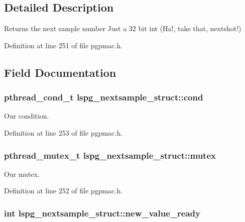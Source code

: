 \subsection{Detailed Description}
Returns the next sample number Just a 32 bit int (Ha!, take that, nextshot!) 

Definition at line 251 of file pgpmac.\-h.



\subsection{Field Documentation}
\hypertarget{structlspg__nextsample__struct_a5b46e4537dac3be839f6c3eeff6b46b6}{
\subsubsection[{cond}]{\setlength{\rightskip}{0pt plus 5cm}pthread\-\_\-cond\-\_\-t lspg\-\_\-nextsample\-\_\-struct\-::cond}}\label{structlspg__nextsample__struct_a5b46e4537dac3be839f6c3eeff6b46b6}


Our condition. 



Definition at line 253 of file pgpmac.\-h.

\hypertarget{structlspg__nextsample__struct_a99408b5825e2510f07be199d2cdc3633}{
\subsubsection[{mutex}]{\setlength{\rightskip}{0pt plus 5cm}pthread\-\_\-mutex\-\_\-t lspg\-\_\-nextsample\-\_\-struct\-::mutex}}\label{structlspg__nextsample__struct_a99408b5825e2510f07be199d2cdc3633}


Our mutex. 



Definition at line 252 of file pgpmac.\-h.

\hypertarget{structlspg__nextsample__struct_ab1c9e9d3dc5140137a7ccf908e95f69e}{
\subsubsection[{new\-\_\-value\-\_\-ready}]{\setlength{\rightskip}{0pt plus 5cm}int lspg\-\_\-nextsample\-\_\-struct\-::new\-\_\-value\-\_\-ready}}\label{structlspg__nextsample__struct_ab1c9e9d3dc5140137a7ccf908e95f69e}


